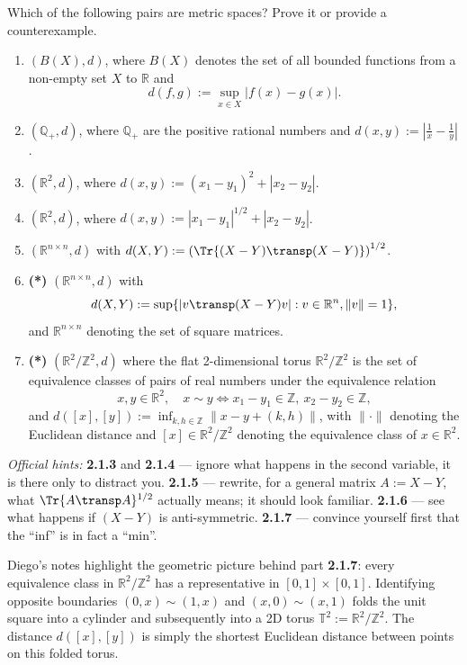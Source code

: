 \begin{exercise}
\label{ex:2.1}
Which of the following pairs are metric spaces? Prove it or provide a counterexample.
\begin{enumerate}[label=\textbf{\arabic*.}]
  \item $(B(X), d)$, where $B(X)$ denotes the set of all bounded functions from a non-empty set
    $X$ to $\mathbb{R}$ and
    $$d(f,g) := \sup_{x \in X} |f(x) - g(x)|.$$
  \item $(\mathbb{Q}_+, d)$, where $\mathbb{Q}_+$ are the positive rational numbers and
    $d(x,y) := \left|\tfrac{1}{x} - \tfrac{1}{y}\right|$.
  \item $(\mathbb{R}^2, d)$, where $d(x,y) := (x_1 - y_1)^2 + |x_2 - y_2|$.
  \item $(\mathbb{R}^2, d)$, where $d(x,y) := |x_1 - y_1|^{1/2} + |x_2 - y_2|$.
  \item $(\mathbb{R}^{n \times n}, d)$ with
    $d(X,Y) := \left(\Tr\{(X-Y)\transp(X-Y)\}\right)^{1/2}$.
  \item \textbf{(*)} $(\mathbb{R}^{n \times n}, d)$ with
    $$d(X,Y) := \sup\{|v\transp(X-Y)v| : v \in \mathbb{R}^n, \|v\| = 1\},$$
    and $\mathbb{R}^{n\times n}$ denoting the set of square matrices.
  \item \textbf{(*)} $(\mathbb{R}^2/\mathbb{Z}^2, d)$ where the flat 2-dimensional torus
    $\mathbb{R}^2/\mathbb{Z}^2$ is the set of equivalence classes of pairs of real numbers under
    the equivalence relation
    $$x, y \in \mathbb{R}^2, \quad x \sim y \iff x_1 - y_1 \in \mathbb{Z},\ x_2 - y_2 \in \mathbb{Z},$$
    and $d([x],[y]) := \inf_{k,h \in \mathbb{Z}} \|x - y + (k,h)\|$, with $\|\cdot\|$ denoting the
    Euclidean distance and $[x] \in \mathbb{R}^2/\mathbb{Z}^2$ denoting the equivalence class of
    $x \in \mathbb{R}^2$.
\end{enumerate}

\textit{Official hints:} \textbf{2.1.3} and \textbf{2.1.4} --- ignore what happens in the second
variable, it is there only to distract you. \textbf{2.1.5} --- rewrite, for a general matrix
$A := X - Y$, what $\Tr\{A\transp A\}^{1/2}$ actually means; it should look familiar.
\textbf{2.1.6} --- see what happens if $(X-Y)$ is anti-symmetric. \textbf{2.1.7} --- convince
yourself first that the ``inf'' is in fact a ``min''.
\end{exercise}

\begin{ainote}
Diego's notes highlight the geometric picture behind part \textbf{2.1.7}: every equivalence class in $\mathbb{R}^2/\mathbb{Z}^2$ has a representative in $[0,1] \times [0,1]$. Identifying opposite boundaries $(0,x) \sim (1,x)$ and $(x,0) \sim (x,1)$ folds the unit square into a cylinder and subsequently into a 2D torus $\mathbb{T}^2 := \mathbb{R}^2/\mathbb{Z}^2$. The distance $d([x],[y])$ is simply the shortest Euclidean distance between points on this folded torus.
\end{ainote}

